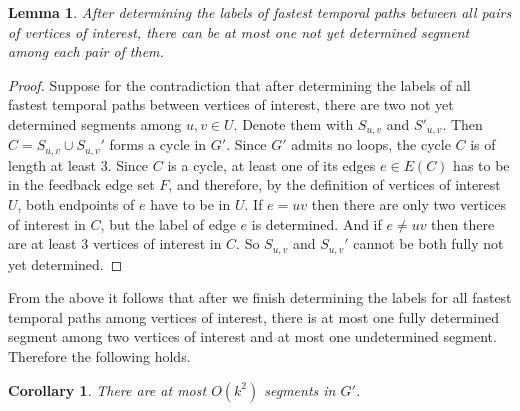 \documentclass[11pt,a4paper]{article}
\newtheorem{lemma}[theorem]{Lemma}
\newtheorem{corollary}[theorem]{Corollary}
\theoremstyle{remark}
\theoremstyle{definition}
\begin{document}
\begin{lemma}
    After determining the labels of fastest temporal paths between all pairs of vertices of interest,
    there can be at most one not yet determined segment among each pair of them.
\end{lemma}
\begin{proof}
   Suppose for the contradiction that after determining the labels of all fastest temporal paths between vertices of interest,
   there are two not yet determined segments among $u,v \in U$.
   Denote them with $S_{u,v}$ and $S'_{u,v}$. 
   Then $C = S_{u,v} \cup S_{u,v}'$ forms a cycle in $G'$. Since $G'$ admits no loops, the cycle $C$ is of length at least $3$.
   Since $C$ is a cycle, at least one of its edges $e \in E(C)$ has to be in the feedback edge set $F$, and therefore, by the definition of vertices of interest $U$, 
   both endpoints of $e$ have to be in $U$.
   If $e = uv$ then there are only two vertices of interest in $C$, but the label of edge $e$ is determined.
   And if $e \neq uv$ then there are at least $3$ vertices of interest in $C$.
   So $S_{u,v}$ and $S_{u,v}'$ cannot be both fully not yet determined.
\end{proof}
From the above it follows that
after we finish determining the labels for all fastest temporal paths among vertices of interest,
there is at most one fully determined segment among two vertices of interest and at most one undetermined segment.
Therefore the following holds.
\begin{corollary}\label{obs:FPT-k2segments}
    There are at most $O(k^2)$ segments in $G'$.
\end{corollary}
\end{document}
